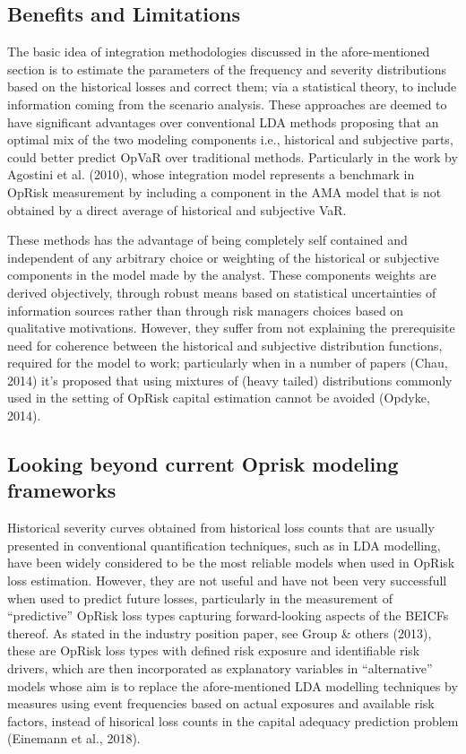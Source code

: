 \documentclass{DissertateUSU}
\begin{document}
\subsection{Benefits and Limitations}
\label{ssec:Benefits and Limitations}

The basic idea of integration methodologies discussed in the
afore-mentioned section is to estimate the parameters of the frequency
and severity distributions based on the historical losses and correct
them; via a statistical theory, to include information coming from the
scenario analysis. These approaches are deemed to have significant
advantages over conventional LDA methods proposing that an optimal mix
of the two modeling components i.e., historical and subjective parts,
could better predict OpVaR over traditional methods. Particularly in the
work by Agostini et al. (2010), whose integration model represents a
benchmark in OpRisk measurement by including a component in the AMA
model that is not obtained by a direct average of historical and
subjective VaR.\medskip

These methods has the advantage of being completely self contained and
independent of any arbitrary choice or weighting of the historical or
subjective components in the model made by the analyst. These components
weights are derived objectively, through robust means based on
statistical uncertainties of information sources rather than through
risk managers choices based on qualitative motivations. However, they
suffer from not explaining the prerequisite need for coherence between
the historical and subjective distribution functions, required for the
model to work; particularly when in a number of papers (Chau, 2014) it's
proposed that using mixtures of (heavy tailed) distributions commonly
used in the setting of OpRisk capital estimation cannot be avoided
(Opdyke, 2014).\medskip

\subsection{Looking beyond current Oprisk modeling frameworks}
\label{ssec:Looking beyond current OpRisk modeling frameworks}

Historical severity curves obtained from historical loss counts that are
usually presented in conventional quantification techniques, such as in
LDA modelling, have been widely considered to be the most reliable
models when used in OpRisk loss estimation. However, they are not useful
and have not been very successfull when used to predict future losses,
particularly in the measurement of ``predictive'' OpRisk loss types
capturing forward-looking aspects of the BEICFs thereof. As stated in
the industry position paper, see Group \& others (2013), these are
OpRisk loss types with defined risk exposure and identifiable risk
drivers, which are then incorporated as explanatory variables in
``alternative'' models whose aim is to replace the afore-mentioned LDA
modelling techniques by measures using event frequencies based on actual
exposures and available risk factors, instead of hisorical loss counts
in the capital adequacy prediction problem (Einemann et al., 2018).
\end{document}

